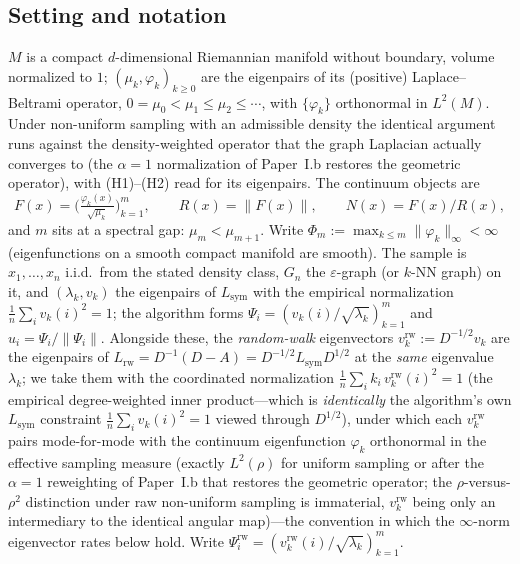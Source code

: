 \documentclass[review,supplement]{siamart220329}
\begin{document}
\subsection*{Setting and notation}
$M$ is a compact $d$-dimensional Riemannian manifold without boundary, volume
normalized to $1$; $(\mu_k,\varphi_k)_{k\ge0}$ are the eigenpairs of its
(positive) Laplace--Beltrami operator, $0=\mu_0<\mu_1\le\mu_2\le\cdots$, with
$\{\varphi_k\}$ orthonormal in $L^2(M)$. Under non-uniform sampling with an
admissible density the identical argument runs against the density-weighted
operator that the graph Laplacian actually converges to
\cite{garciatrillos2018,calder2022} (the $\alpha{=}1$ normalization of
Paper~I.b restores the geometric operator), with (H1)--(H2) read for
its eigenpairs. The continuum objects are
\[
F(x)=\Big(\tfrac{\varphi_k(x)}{\sqrt{\mu_k}}\Big)_{k=1}^{m},\qquad
R(x)=\lVert F(x)\rVert,\qquad N(x)=F(x)/R(x),
\]
and $m$ sits at a spectral gap: $\mu_m<\mu_{m+1}$. Write
$\Phi_m:=\max_{k\le m}\lVert\varphi_k\rVert_\infty<\infty$ (eigenfunctions on a
smooth compact manifold are smooth). The sample is $x_1,\dots,x_n$ i.i.d.\ from
the stated density class, $G_n$ the $\varepsilon$-graph (or $k$-NN graph) on it,
and $(\lambda_k,v_k)$ the eigenpairs of $L_{\mathrm{sym}}$ with the empirical
normalization $\tfrac1n\sum_i v_k(i)^2=1$; the algorithm forms
$\Psi_i=(v_k(i)/\sqrt{\lambda_k})_{k=1}^m$ and
$\hat u_i=\Psi_i/\lVert\Psi_i\rVert$. Alongside these, the \emph{random-walk}
eigenvectors $v^{\mathrm{rw}}_k:=D^{-1/2}v_k$ are the eigenpairs of
$L_{\mathrm{rw}}=D^{-1}(D-A)=D^{-1/2}L_{\mathrm{sym}}D^{1/2}$ at the \emph{same}
eigenvalue $\lambda_k$; we take them with the coordinated normalization
$\tfrac1n\sum_i k_i\,v^{\mathrm{rw}}_k(i)^2=1$ (the empirical degree-weighted inner
product---which is \emph{identically} the algorithm's own $L_{\mathrm{sym}}$
constraint $\tfrac1n\sum_i v_k(i)^2=1$ viewed through $D^{1/2}$), under which each
$v^{\mathrm{rw}}_k$ pairs mode-for-mode with the continuum eigenfunction
$\varphi_k$ orthonormal in the effective sampling measure (exactly $L^2(\rho)$ for
uniform sampling or after the $\alpha{=}1$ reweighting of Paper~I.b that
restores the geometric operator; the $\rho$-versus-$\rho^2$ distinction under raw
non-uniform sampling is immaterial, $v^{\mathrm{rw}}_k$ being only an intermediary
to the identical angular map)---the convention in which the $\infty$-norm
eigenvector rates below hold. Write
$\Psi^{\mathrm{rw}}_i=(v^{\mathrm{rw}}_k(i)/\sqrt{\lambda_k})_{k=1}^m$.
\end{document}
